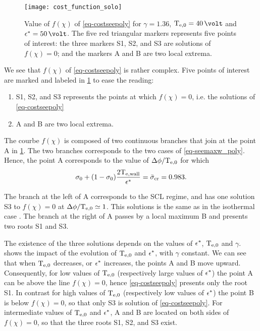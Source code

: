 \begin{figure}[!hbt]
  \centering
  \texttt{[image: cost\_function\_solo]}
  \caption{Value of $f(\chi)$ of \cref{eq-costseepoly} for $\gamma = 1.36$, $\Teb=40\,\volt$ and $\crover=50\,\volt$. The five red triangular markers represents five points of interest\string: the three markers S1, S2, and S3 are solutions of $f(\chi) = 0$; and the markers A and B are two local extrema. }
  \label{fig-costfunction}
\end{figure}

We see that $f(\chi)$ of \cref{eq-costseepoly} is rather complex.
Five points of interest are marked and labeled in \cref{fig-costfunction} to ease the reading\string: 
\begin{enumerate}
  \item S1, S2, and S3 represents the points at which $f(\chi)=0$, i.e. the solutions of  \cref{eq-costseepoly}
  \item A and B are two local extrema.
\end{enumerate}

The courbe $f(\chi)$ is composed of two continuous branches that join at the point A in \cref{fig-costfunction}.
The two branches corresponds to the two cases of \cref{eq-seemaxw_poly}. Hence, the point A corresponds to the value of $\Delta \phi/\mathrm{T_{e, 0}}$ for which  \[ \sigma_0 + ( 1 - \sigma_0) \frac{ 2 \mathrm{T_{e, wall}}  }{\epsilon^{*}} =  \bar{\sigma }_{\rm cr} = 0.983. \]

The branch at the left of A corresponds to the \ac{SCL} regime, and has one solution S3 to $f(\chi)=0$ at $\Delta \phi / \mathrm{T_{e, 0}} \simeq 1$.
This solutions is the same as in the isothermal case \citep{hobbs1967}.
The branch at the right of A passes by a local maximum B and presents two roots S1 and S3.

The existence of the three solutions depends on the values of $\epsilon^{*}$, $\mathrm{T_{e, 0}}$ and $\gamma$.
 shows the impact of the evolution of $\mathrm{T_{e, 0}}$ and $\epsilon^{*}$, with $\gamma$ constant.
We can see that when $\mathrm{T_{e, 0}}$ decreases, or $\epsilon^{*}$ increases, the points A and B move upward.
Consequently, for low values of $\mathrm{T_{e, 0}}$ (respectively large values of $\epsilon^{*}$) the point A can be above the line $f(\chi) = 0$, hence  \cref{eq-costseepoly} presents only the root S1.
In contrast for high values of $\mathrm{T_{e, 0}}$ (respectively low values of $\epsilon^{*}$) the point B is below $f(\chi) = 0$, so that only S3 is solution of  \cref{eq-costseepoly}.
For intermediate values of $\mathrm{T_{e, 0}}$ and $\epsilon^{*}$, A and B are located on both sides of $f(\chi) = 0$, so that the three roots S1, S2, and S3 exist.
\renewcommand\subfigurewidth{0.47\textwidth}

